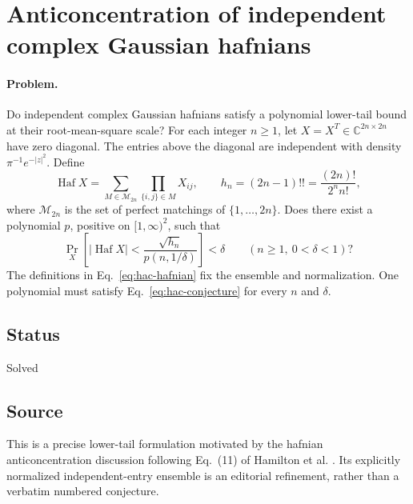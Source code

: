 \section{Anticoncentration of independent complex Gaussian hafnians}
\label{sec:op_55be40726cdf7304}

\paragraph{Problem.}
Do independent complex Gaussian hafnians satisfy a polynomial lower-tail bound at their root-mean-square scale?
For each integer $n\geq1$, let $X=X^T\in\mathbb C^{2n\times2n}$ have zero diagonal.
The entries above the diagonal are independent with density $\pi^{-1}e^{-|z|^2}$.
Define
\begin{equation}
 \operatorname{Haf}X=\sum_{M\in\mathcal M_{2n}}\prod_{\{i,j\}\in M}X_{ij},
 \qquad h_n=(2n-1)!!=\frac{(2n)!}{2^n n!},
 \label{eq:hac-hafnian}
\end{equation}
where $\mathcal M_{2n}$ is the set of perfect matchings of $\{1,\ldots,2n\}$.
Does there exist a polynomial $p$, positive on $[1,\infty)^2$, such that
\begin{equation}
 \Pr_X\!\left[|\operatorname{Haf}X|<
       \frac{\sqrt{h_n}}{p(n,1/\delta)}\right]<\delta
 \qquad(n\geq1,\ 0<\delta<1)?
 \label{eq:hac-conjecture}
\end{equation}
The definitions in Eq.~\eqref{eq:hac-hafnian} fix the ensemble and normalization.
One polynomial must satisfy Eq.~\eqref{eq:hac-conjecture} for every $n$ and $\delta$.

\subsection*{Status}

Solved

\subsection*{Source}

This is a precise lower-tail formulation motivated by the hafnian anticoncentration discussion following Eq.~(11) of Hamilton et al. .
Its explicitly normalized independent-entry ensemble is an editorial refinement, rather than a verbatim numbered conjecture.

